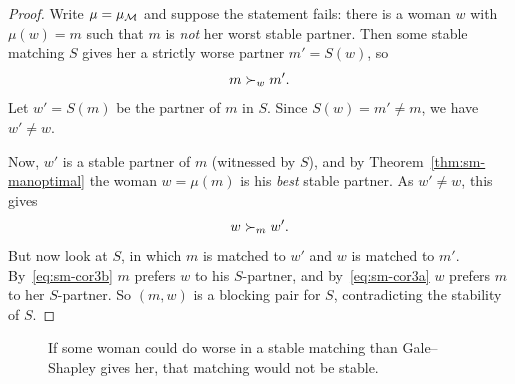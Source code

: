 \begin{proof}
Write $\mu = \mu_{\mathcal{M}}$ and suppose the statement fails: there is a woman $w$
with $\mu(w) = m$ such that $m$ is \emph{not} her worst stable partner. Then
some stable matching $S$ gives her a strictly worse partner
$m' = S(w)$, so
\begin{equation}\label{eq:sm-cor3a}
  m \succ_{w} m' .
\end{equation}
Let $w' = S(m)$ be the partner of $m$ in $S$. Since $S(w) = m' \neq m$, we have
$w' \neq w$.

Now, $w'$ is a stable partner of $m$ (witnessed by $S$), and by
Theorem~\ref{thm:sm-manoptimal} the woman $w = \mu(m)$ is his \emph{best} stable
partner. As $w' \neq w$, this gives
\begin{equation}\label{eq:sm-cor3b}
  w \succ_{m} w' .
\end{equation}
But now look at $S$, in which $m$ is matched to $w'$ and $w$ is matched to
$m'$. By~\eqref{eq:sm-cor3b} $m$ prefers $w$ to his $S$-partner, and
by~\eqref{eq:sm-cor3a} $w$ prefers $m$ to her $S$-partner. So $(m,w)$ is a
blocking pair for $S$, contradicting the stability of $S$.
\end{proof}

\begin{figure}[ht]
\centering
{}
\caption{If some woman could do worse in a stable matching than
Gale--Shapley gives her, that matching would not be stable.}
\label{fig:sm-cor3proof}
\end{figure}

